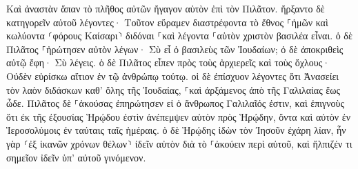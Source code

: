 \documentclass{openreader}
\begin{document}
Καὶ ἀναστὰν ἅπαν τὸ πλῆθος αὐτῶν ἤγαγον αὐτὸν ἐπὶ τὸν Πιλᾶτον. 
ἤρξαντο δὲ κατηγορεῖν αὐτοῦ λέγοντες· Τοῦτον εὕραμεν διαστρέφοντα τὸ ἔθνος ⸀ἡμῶν καὶ κωλύοντα ⸂φόρους Καίσαρι⸃ διδόναι ⸀καὶ λέγοντα ⸀αὑτὸν χριστὸν βασιλέα εἶναι. 
ὁ δὲ Πιλᾶτος ⸀ἠρώτησεν αὐτὸν λέγων· Σὺ εἶ ὁ βασιλεὺς τῶν Ἰουδαίων; ὁ δὲ ἀποκριθεὶς αὐτῷ ἔφη· Σὺ λέγεις. 
ὁ δὲ Πιλᾶτος εἶπεν πρὸς τοὺς ἀρχιερεῖς καὶ τοὺς ὄχλους· Οὐδὲν εὑρίσκω αἴτιον ἐν τῷ ἀνθρώπῳ τούτῳ. 
οἱ δὲ ἐπίσχυον λέγοντες ὅτι Ἀνασείει τὸν λαὸν διδάσκων καθ’ ὅλης τῆς Ἰουδαίας, ⸀καὶ ἀρξάμενος ἀπὸ τῆς Γαλιλαίας ἕως ὧδε. 
Πιλᾶτος δὲ ⸀ἀκούσας ἐπηρώτησεν εἰ ὁ ἄνθρωπος Γαλιλαῖός ἐστιν, 
καὶ ἐπιγνοὺς ὅτι ἐκ τῆς ἐξουσίας Ἡρῴδου ἐστὶν ἀνέπεμψεν αὐτὸν πρὸς Ἡρῴδην, ὄντα καὶ αὐτὸν ἐν Ἱεροσολύμοις ἐν ταύταις ταῖς ἡμέραις. 
ὁ δὲ Ἡρῴδης ἰδὼν τὸν Ἰησοῦν ἐχάρη λίαν, ἦν γὰρ ⸂ἐξ ἱκανῶν χρόνων θέλων⸃ ἰδεῖν αὐτὸν διὰ τὸ ⸀ἀκούειν περὶ αὐτοῦ, καὶ ἤλπιζέν τι σημεῖον ἰδεῖν ὑπ’ αὐτοῦ γινόμενον. 
\end{document}
